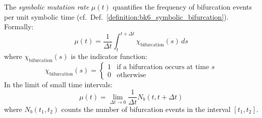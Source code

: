 \begin{definition}
\label{definition:bk6_mutation_rate}
The \emph{symbolic mutation rate} $\mu(t)$ quantifies the frequency of bifurcation events per unit symbolic time (cf.~Def.~\ref{definition:bk6_symbolic_bifurcation}). Formally:
\begin{equation}
\mu(t) = \frac{1}{\Delta t} \int_{t}^{t+\Delta t} \chi_{\text{bifurcation}}(s) \, ds
\end{equation}
where $\chi_{\text{bifurcation}}(s)$ is the indicator function:
\begin{equation}
\chi_{\text{bifurcation}}(s) = 
\begin{cases}
1 & \text{if a bifurcation occurs at time } s \\
0 & \text{otherwise}
\end{cases}
\end{equation}
In the limit of small time intervals:
\begin{equation}
\mu(t) = \lim_{\Delta t \to 0} \frac{1}{\Delta t} N_b(t, t+\Delta t)
\end{equation}
where $N_b(t_1, t_2)$ counts the number of bifurcation events in the interval $[t_1, t_2]$.
\end{definition}
